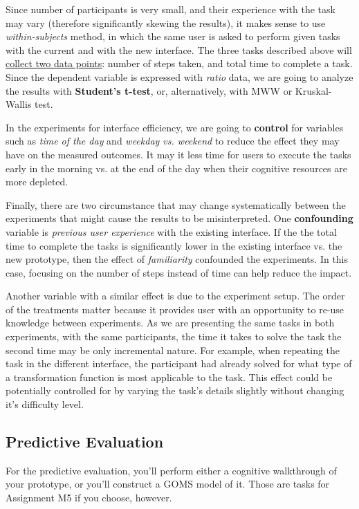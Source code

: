 \documentclass[12pt,letterpaper]{article}
\begin{document}
\bigskip
Since number of participants is very small, and their experience with the task may vary (therefore significantly skewing the results), it makes sense to use \textit{within-subjects} method, in which the same user is asked to perform given tasks with the current and with the new interface. The three tasks described above will \underline{collect two data points}: number of steps taken, and total time to complete a task. Since the dependent variable is expressed with \textit{ratio} data, we are going to analyze the results with \textbf{Student's t-test}, or, alternatively, with MWW or Kruskal-Wallis test. 

In the experiments for interface efficiency, we are going to \textbf{control} for variables such as \textit{time of the day} and \textit{weekday vs. weekend} to reduce the effect they may have on the measured outcomes. It may it less time for users to execute the tasks early in the morning vs. at the end of the day when their cognitive resources are more depleted. 

Finally, there are two circumstance that may change systematically between the experiments that might cause the results to be misinterpreted. One \textbf{confounding} variable is \textit{previous user experience} with the existing interface. If the the total time to complete the tasks is significantly lower in the existing interface vs. the new prototype, then the effect of \textit{familiarity}  confounded the experiments. In this case, focusing on the number of steps instead of time can help reduce the impact.

Another variable with a similar effect is due to the experiment setup. The order of the treatments matter because it provides user with an opportunity to re-use knowledge between experiments. As we are presenting the same tasks in both experiments, with the same participants, the time it takes to solve the task the second time may be only incremental nature. For example, when repeating the task in the different interface, the participant had already solved for what type of a transformation function is most applicable to the task. This effect could be potentially controlled for by varying the task's details slightly without changing it's difficulty level.


\subsection*{Predictive Evaluation}

For the predictive evaluation, you’ll perform either a cognitive walkthrough of your prototype, or you’ll construct a GOMS model of it. Those are tasks for Assignment M5 if you choose, however.
\end{document}
